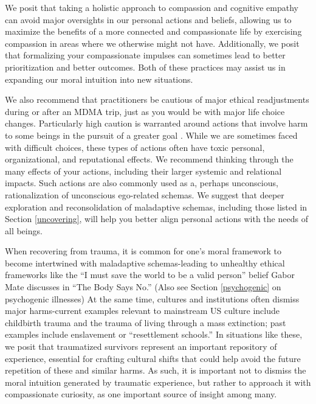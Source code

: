 \documentclass[12pt,letterpaper]{book}
\begin{document}
We posit that taking a holistic approach to compassion and cognitive empathy can avoid major oversights in our personal actions and beliefs, allowing us to maximize the benefits of a more connected and compassionate life by exercising compassion in areas where we otherwise might not have. Additionally, we posit that formalizing your compassionate impulses can sometimes lead to better prioritization and better outcomes. Both of these practices may assist us in expanding our moral intuition into new situations.

We also recommend that practitioners be cautious of major ethical readjustments during or after an MDMA trip, just as you would be with major life choice changes. Particularly high caution is warranted around actions that involve harm to some beings in the pursuit of a greater goal \cite{askellSelfServing}. While we are sometimes faced with difficult choices, these types of actions often have toxic personal, organizational, and reputational effects. We recommend thinking through the many effects of your actions, including their larger systemic and relational impacts. Such actions are also commonly used as a, perhaps unconscious, rationalization of unconscious ego-related schemas. We suggest that deeper exploration and reconsolidation of maladaptive schemas, including those listed in Section \ref{uncovering}, will help you better align personal actions with the needs of all beings.

When recovering from trauma, it is common for one's moral framework to become intertwined with maladaptive schemas-leading to unhealthy ethical frameworks like the “I must save the world to be a valid person” belief Gabor Mate discusses in “The Body Says No.” (Also see Section \ref{psychogenic} on psychogenic illnesses) At the same time, cultures and institutions often dismiss major harms-current examples relevant to mainstream US culture include childbirth trauma and the trauma of living through a mass extinction; past examples include enslavement or “resettlement schools.” In situations like these, we posit that traumatized survivors represent an important repository of experience, essential for crafting cultural shifts that could help avoid the future repetition of these and similar harms. As such, it is important not to dismiss the moral intuition generated by traumatic experience, but rather to approach it with compassionate curiosity, as one important source of insight among many.

\end{document}
